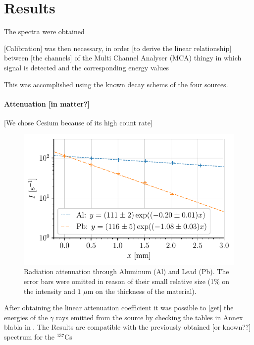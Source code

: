 \section{Results}
The spectra were obtained

[Calibration] was then necessary,
in order [to derive the linear relationship] between [the channels] of the Multi Channel Analyser (MCA) thingy in which signal is detected 
and the corresponding energy values

This was accomplished using the known decay schems of the four sources.

\paragraph{Attenuation [in matter?]}
[We chose Cesium because of its high count rate]

\begin{figure}[htbp]
    \centering
    \includegraphics[scale=1]{figures/attenuation_coefficient.pdf}
    \caption{Radiation attenuation through Aluminum (Al) and Lead (Pb). 
             The error bars were omitted in reason of their small relative size 
             (1\% on the intensity and $1$ $\mu$m on the thickness of the material).}
    \label{fig:attenuation_coefficient}
\end{figure}

After obtaining the linear attenuation coefficient it was possible to [get] the energies of the $\gamma$ rays emitted from the source by checking the tables in Annex blabla in \cite{notice_generale}.
The Results are compatible with the previously obtained [or known??] spectrum for the $^{137}$Cs